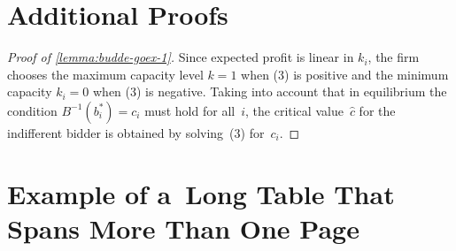 \documentclass[12pt, a4paper, oneside]{article}
\newlength{\baselinedist}
\theoremstyle{Plain}
\theoremstyle{Definition}
\theoremstyle{Remark}
\begin{document}
\begin{appendix}

\section{Additional Proofs}
\label{app:proofs}

\begin{proof}[Proof of \autoref{lemma:budde-goex-1}]
	Since expected profit is linear in $k_i$, the firm chooses the maximum capacity level ${k = 1}$ when (3) is positive and the minimum capacity ${k_i = 0}$ when (3) is negative. Taking into account that in equilibrium the condition ${B^{-1}(b_i^*) = c_i}$ must hold for all~$i$, the critical value~$\hat{c}$ for the indifferent bidder is obtained by solving~(3) for~$c_i$.
\end{proof}

\clearpage

\raggedbottom

\section{Example of a~Long Table That Spans More Than One Page}

\newcommand{\pz}{\phantom{0}}
\def\tablecapstrut{\vrule height\baselinedist depth1ex width0pt}

\begingroup


\end{appendix}
\end{document}
